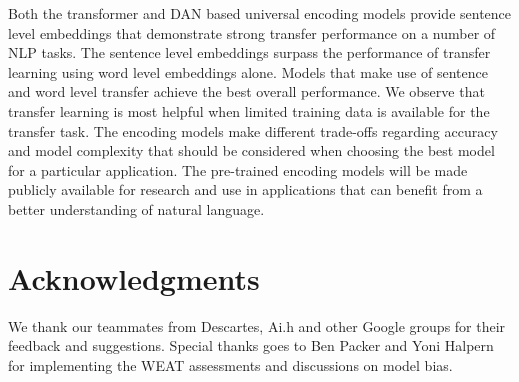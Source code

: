 \documentclass[11pt,a4paper]{article}
\begin{document}
Both the transformer and DAN based universal encoding models provide sentence level embeddings that demonstrate strong transfer performance on a number of NLP tasks. The sentence level embeddings surpass the performance of transfer learning using word level embeddings alone. Models that make use of sentence and word level transfer achieve the best overall performance. We observe that transfer learning is most helpful when limited training data is available for the transfer task. The encoding models make different trade-offs regarding accuracy and model complexity that should be considered when choosing the best model for a particular application. The pre-trained encoding models will be made publicly available for research and use in applications that can benefit from a better understanding of natural language.

\section*{Acknowledgments}

We thank our teammates from Descartes, Ai.h and other Google groups for their feedback and suggestions. Special thanks goes to Ben Packer and Yoni Halpern for implementing the WEAT assessments and discussions on model bias.





\appendix
\end{document}
